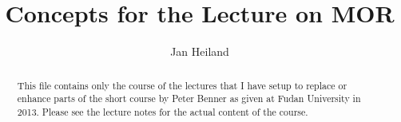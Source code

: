 \documentclass[a4paper,10pt]{article}
\title{Concepts for the Lecture on MOR}
\author{Jan Heiland}
\theoremstyle{definition}
\begin{document}
\maketitle
\begin{abstract}
	This file contains only the course of the lectures that I have setup to replace or enhance parts of the short course by Peter Benner as given at Fudan University in 2013. Please see the lecture notes for the actual content of the course.
\end{abstract}
\tableofcontents







\end{document}
